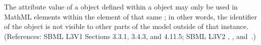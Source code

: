 The  attribute value of a \LocalParameter object defined within a
\KineticLaw object may only be used in MathML  elements within
the  element of that same \KineticLaw; in other words, the
identifier of the \LocalParameter object is not visible to other parts of
the model outside of that \KineticLaw instance.  (References: SBML L3V1 Sections 3.3.1, 3.4.3, and 4.11.5; SBML L3V2
, ,
and~.)
